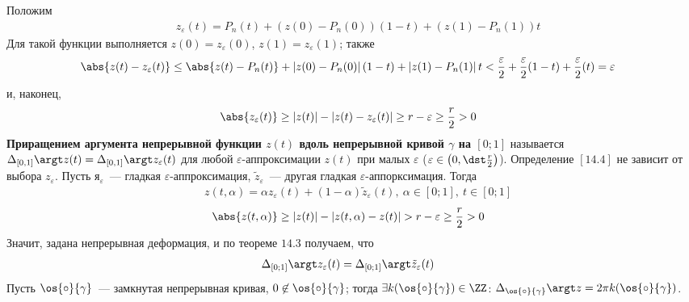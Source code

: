 Положим
\begin{align*}
  & z_\varepsilon(t) = P_n(t) + \left( z(0)-P_n(0) \right)\left( 1-t \right) + \left( z(1)-P_n(1) \right)t
\end{align*}
Для такой функции выполняется $z(0) = z_\varepsilon(0)$, $z(1) =
z_\varepsilon(1)$; также
\begin{align*}
  & \abs{z(t) - z_\varepsilon(t)} \leq \abs{z(t) - P_n(t)} + \left| z(0)-P_n(0) \right| \left( 1-t \right) + \left| z(1)-P_n(1) \right|t < \frac{\varepsilon}{2} + \frac{\varepsilon}{2}(1-t) + \frac{\varepsilon}{2}(t) = \varepsilon
\end{align*}
и, наконец,
\begin{align*}
  & \abs{z_\varepsilon(t)} \geq \left| z(t) \right| - \left| z(t) - z_\varepsilon(t) \right| \geq r - \varepsilon \geq \frac{r}{2} > 0
\end{align*}
\Def
\textbf{Приращением аргумента непрерывной функции $z(t)$ вдоль непрерывной
  кривой $\gamma$ на $[0;1]$} называется $\Delta_{[0,1]}\argt z(t) =
\Delta_{[0,1]}\argt z_\varepsilon(t)$ для любой $\varepsilon$-аппроксимации
$z(t)$ при малых $\varepsilon$ ($\varepsilon \in \left( 0, \dst \frac{r}{2}
\right)$).
\prop
Определение $[14.4]$ не зависит от выбора $z_\varepsilon$.
\pr
Пусть $я_\varepsilon$~--- гладкая $\varepsilon$-аппроксимация,
$\tilde{z}_\varepsilon$~--- другая гладкая $\varepsilon$-аппорксимация.
Тогда
\begin{align*}
  & z(t, \alpha) = \alpha z_\varepsilon(t) + (1-\alpha)\tilde{z}_\varepsilon(t), \ \alpha \in [0;1], \ t \in [0;1]
\end{align*}
\begin{align*}
  & \abs{z(t, \alpha)} \geq \left| z(t) \right| - \left| z(t, \alpha) - z(t) \right| > r - \varepsilon \geq \frac{r}{2} > 0
\end{align*}
Значит, задана непрерывная деформация, и по теореме $14.3$ получаем, что
\begin{align*}
  & \Delta_{[0;1]}\argt z_\varepsilon(t) = \Delta_{[0;1]}\argt \tilde{z}_\varepsilon(t)
\end{align*}
\corollary
Пусть $\os{\circ}{\gamma}$~--- замкнутая непрерывная кривая, $0 \not \in
\os{\circ}{\gamma}$; тогда $\exists k(\os{\circ}{\gamma})\in \ZZ$:
$\Delta_{\os{\circ}{\gamma}}\argt z = 2 \pi k(\os{\circ}{\gamma})$.
